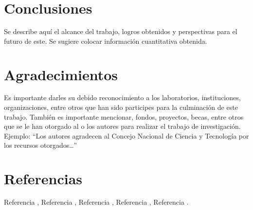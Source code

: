    
    
    \section{Conclusiones}
    
        Se describe aquí el alcance del trabajo, logros obtenidos y perspectivas para el futuro de este. Se sugiere colocar información cuantitativa obtenida.


    
    
    \section{Agradecimientos}
    
        Es importante darles su debido reconocimiento a los laboratorios, instituciones, organizaciones, entre otros que han sido participes para la culminación de este trabajo. También es importante mencionar, fondos, proyectos, becas, entre otros que se le han otorgado al o los autores para realizar el trabajo de investigación. Ejemplo: “Los autores agradecen al Concejo Nacional de Ciencia y Tecnología por los recursos otorgados…”


    
    
    \section*{Referencias}
    
    Referencia \cite{Maynards},
    Referencia \cite{glossar_item24},
    Referencia \cite{fadesaing_circuitos},
    Referencia \cite{pozarica_uo_estudio_trabajo},
    Referencia \cite{significados_optimizacion}.
   
    
    
    
    \appendix

        
        \label{anexo:listaDeMateriales.pdf}

        
        \label{anexo:lcdTrazo.pdf}
    
        
        \label{anexo:lcdModelo.pdf}
        
        \label{anexo:placaProtoboardTrazo.pdf}
        
